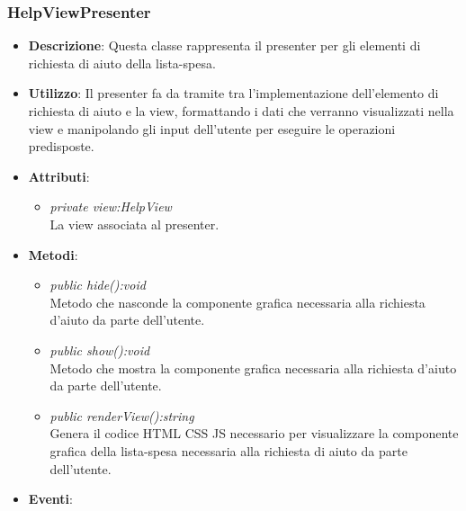 \subsubsection{HelpViewPresenter}
\begin{itemize}
\item \textbf{Descrizione}: Questa classe rappresenta il presenter per gli elementi di richiesta di aiuto della lista-spesa.
\item \textbf{Utilizzo}: Il presenter fa da tramite tra l'implementazione dell'elemento di richiesta di aiuto e la view, formattando i dati che verranno visualizzati nella view e manipolando gli input dell'utente per eseguire le operazioni predisposte.
\item \textbf{Attributi}:
	\begin{itemize}
	\item \textit{private view:HelpView}\\
	La view associata al presenter.
	\end{itemize}
\item \textbf{Metodi}:
	\begin{itemize}
	\item \textit{public hide():void}\\
	Metodo che nasconde la componente grafica necessaria alla richiesta d'aiuto da parte dell'utente.
	\item \textit{public show():void}\\
	Metodo che mostra la componente grafica necessaria alla richiesta d'aiuto da parte dell'utente.
	\item \textit{public renderView():string}\\
	Genera il codice HTML CSS JS necessario per visualizzare la componente grafica della lista-spesa necessaria alla richiesta di aiuto da parte dell'utente.
	\end{itemize}
\item \textbf{Eventi}:
\end{itemize}